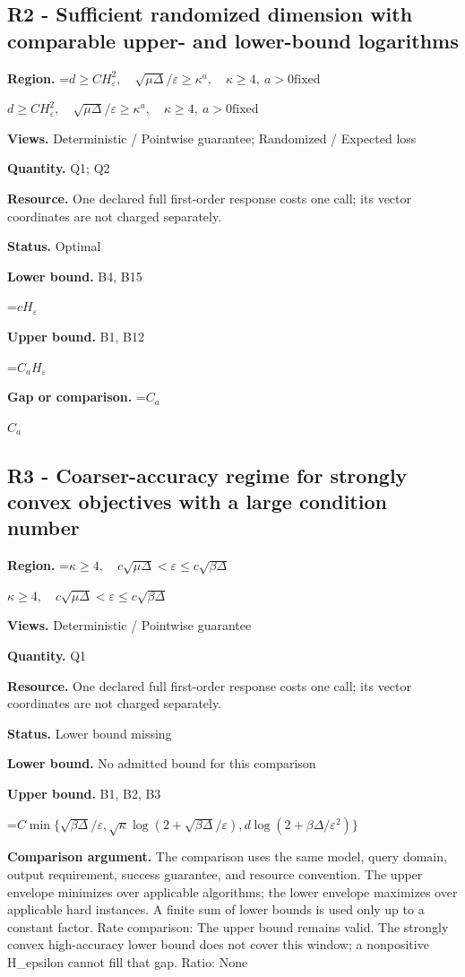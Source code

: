 \documentclass[10pt,a4paper]{article}
\newcommand{\AtlasMath}[1]{\par\begingroup\centering\setbox0=\hbox{$\displaystyle #1$}\ifdim\wd0>1.4\linewidth\typeout{ATLAS WIDE FORMULA: \the\wd0}\fi\ifdim\wd0>\linewidth\resizebox{\linewidth}{!}{\box0}\else\box0\fi\par\endgroup}
\newcommand{\AtlasInlineMath}[1]{\begingroup\setbox0=\hbox{$#1$}\ifdim\wd0>.4\linewidth\endgroup\AtlasMath{#1}\else\endgroup$#1$\fi}
\begin{document}
\subsection{R2 - Sufficient randomized dimension with comparable upper- and lower-bound logarithms}
\textbf{Region.} \AtlasInlineMath{d\ge CH_\varepsilon^2,\quad\sqrt{\mu\Delta}/\varepsilon\ge\kappa^a,\quad\kappa\ge4,\ a>0\text{fixed}}

\textbf{Views.} Deterministic / Pointwise guarantee; Randomized / Expected loss

\textbf{Quantity.} Q1; Q2

\textbf{Resource.} One declared full first-order response costs one call; its vector coordinates are not charged separately.

\textbf{Status.} Optimal

\textbf{Lower bound.} B4, B15

\AtlasMath{cH_\varepsilon}
\textbf{Upper bound.} B1, B12

\AtlasMath{C_aH_\varepsilon}
\textbf{Gap or comparison.} \AtlasInlineMath{C_a}

\subsection{R3 - Coarser-accuracy regime for strongly convex objectives with a large condition number}
\textbf{Region.} \AtlasInlineMath{\kappa\ge4,\quad c\sqrt{\mu\Delta}<\varepsilon\le c\sqrt{\beta\Delta}}

\textbf{Views.} Deterministic / Pointwise guarantee

\textbf{Quantity.} Q1

\textbf{Resource.} One declared full first-order response costs one call; its vector coordinates are not charged separately.

\textbf{Status.} Lower bound missing

\textbf{Lower bound.} No admitted bound for this comparison

\textbf{Upper bound.} B1, B2, B3

\AtlasMath{C\min\{\sqrt{\beta\Delta}/\varepsilon,\sqrt\kappa\log(2+\sqrt{\beta\Delta}/\varepsilon),d\log(2+\beta\Delta/\varepsilon^2)\}}
\textbf{Comparison argument.} The comparison uses the same model, query domain, output requirement, success guarantee, and resource convention. The upper envelope minimizes over applicable algorithms; the lower envelope maximizes over applicable hard instances. A finite sum of lower bounds is used only up to a constant factor. Rate comparison: The upper bound remains valid. The strongly convex high-accuracy lower bound does not cover this window; a nonpositive H\_epsilon cannot fill that gap. Ratio: None
\end{document}
